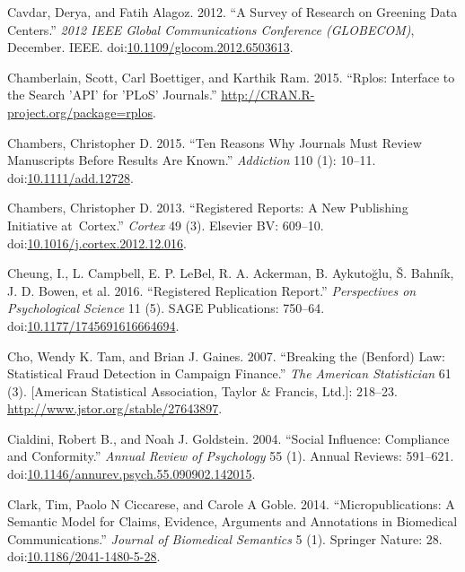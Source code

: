 \documentclass[a5paper]{book}
\begin{document}
\hypertarget{ref-doi:10.1109ux2fglocom.2012.6503613}{}
Cavdar, Derya, and Fatih Alagoz. 2012. ``A Survey of Research on
Greening Data Centers.'' \emph{2012 IEEE Global Communications
Conference (GLOBECOM)}, December. IEEE.
doi:\href{https://doi.org/10.1109/glocom.2012.6503613}{10.1109/glocom.2012.6503613}.

\hypertarget{ref-Chamberlain2015-tg}{}
Chamberlain, Scott, Carl Boettiger, and Karthik Ram. 2015. ``Rplos:
Interface to the Search 'API' for 'PLoS' Journals.''
\url{http://CRAN.R-project.org/package=rplos}.

\hypertarget{ref-doi:10.1111ux2fadd.12728}{}
Chambers, Christopher D. 2015. ``Ten Reasons Why Journals Must Review
Manuscripts Before Results Are Known.'' \emph{Addiction} 110 (1):
10--11. doi:\href{https://doi.org/10.1111/add.12728}{10.1111/add.12728}.

\hypertarget{ref-doi:10.1016ux2fj.cortex.2012.12.016}{}
Chambers, Christopher D. 2013. ``Registered Reports: A New Publishing
Initiative at~Cortex.'' \emph{Cortex} 49 (3). Elsevier BV: 609--10.
doi:\href{https://doi.org/10.1016/j.cortex.2012.12.016}{10.1016/j.cortex.2012.12.016}.

\hypertarget{ref-doi:10.1177ux2f1745691616664694}{}
Cheung, I., L. Campbell, E. P. LeBel, R. A. Ackerman, B. Aykutoğlu, Š.
Bahník, J. D. Bowen, et al. 2016. ``Registered Replication Report.''
\emph{Perspectives on Psychological Science} 11 (5). SAGE Publications:
750--64.
doi:\href{https://doi.org/10.1177/1745691616664694}{10.1177/1745691616664694}.

\hypertarget{ref-doi:10.2307ux2f27643897}{}
Cho, Wendy K. Tam, and Brian J. Gaines. 2007. ``Breaking the (Benford)
Law: Statistical Fraud Detection in Campaign Finance.'' \emph{The
American Statistician} 61 (3). {[}American Statistical Association,
Taylor \& Francis, Ltd.{]}: 218--23.
\url{http://www.jstor.org/stable/27643897}.

\hypertarget{ref-doi:10.1146ux2fannurev.psych.55.090902.142015}{}
Cialdini, Robert B., and Noah J. Goldstein. 2004. ``Social Influence:
Compliance and Conformity.'' \emph{Annual Review of Psychology} 55 (1).
Annual Reviews: 591--621.
doi:\href{https://doi.org/10.1146/annurev.psych.55.090902.142015}{10.1146/annurev.psych.55.090902.142015}.

\hypertarget{ref-doi:10.1186ux2f2041-1480-5-28}{}
Clark, Tim, Paolo N Ciccarese, and Carole A Goble. 2014.
``Micropublications: A Semantic Model for Claims, Evidence, Arguments
and Annotations in Biomedical Communications.'' \emph{Journal of
Biomedical Semantics} 5 (1). Springer Nature: 28.
doi:\href{https://doi.org/10.1186/2041-1480-5-28}{10.1186/2041-1480-5-28}.
\end{document}
